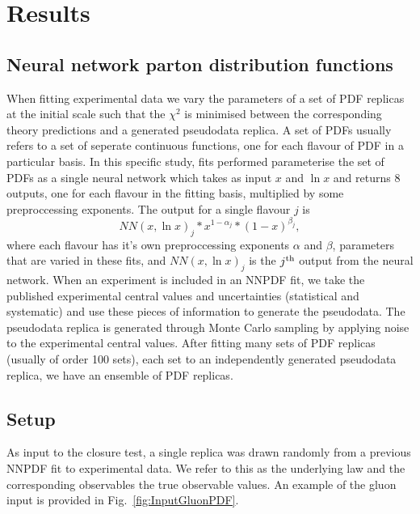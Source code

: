 \section{Results}

\subsection{Neural network parton distribution functions}

When fitting experimental data we vary the parameters of a set of PDF replicas
at the initial scale such that the $\chi^2$ is minimised between the
corresponding theory predictions and a generated pseudodata replica. A set of
PDFs usually refers to a set of seperate continuous functions, one for each
flavour of PDF in a particular basis. In this specific study, fits performed
parameterise the set of PDFs as a single neural network which takes
as input $x$ and $\ln x$ and returns 8 outputs, one for each flavour in the
fitting basis, multiplied by some preproccessing exponents. The output for a
single flavour $j$ is
\begin{equation}
    NN(x, \ln x)_j * x^{1-\alpha_j} * (1-x)^{\beta_j},
\end{equation}
where each flavour has it's own preproccessing exponents $\alpha$ and $\beta$,
parameters that are varied in these fits, and $NN(x, \ln x)_j$ is the
$j^{\rm th}$ output from the neural network.
When an experiment is included in an NNPDF fit, we take the published
experimental central values and uncertainties (statistical and systematic)
and use these pieces of information to generate the pseudodata.
The pseudodata replica is generated
through Monte Carlo sampling by applying noise to the experimental
central values.
After fitting many sets of PDF replicas (usually of order 100 sets),
each set to an independently generated pseudodata replica, we have an ensemble of
PDF replicas.

\subsection{Setup}

As input to the closure test, a single replica was drawn randomly from
a previous NNPDF fit to experimental data. We refer to this as the underlying
law and the corresponding observables the true observable values. An example
of the gluon input is provided in Fig.~\ref{fig:InputGluonPDF}.

